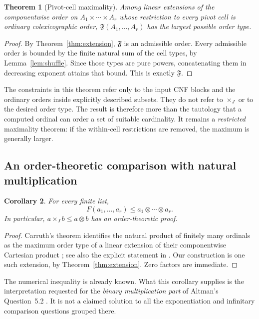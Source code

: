 \documentclass[11pt,letterpaper]{article}
\newtheorem{theorem}{Theorem}[section]
\newtheorem{corollary}[theorem]{Corollary}
\theoremstyle{definition}
\theoremstyle{remark}
\newcommand{\J}{\mathbin{\times_{\!J}}}
\newcommand{\FF}{\mathfrak F}
\begin{document}
\begin{theorem}[Pivot-cell maximality]\label{thm:maximality}
Among linear extensions of the componentwise order on
$A_1\times\cdots\times A_r$ whose restriction to every pivot cell is
ordinary colexicographic order, $\FF(A_1,\ldots,A_r)$ has the largest
possible order type.
\end{theorem}

\begin{proof}
By Theorem~\ref{thm:extension}, $\FF$ is an admissible order. Every
admissible order is bounded by the finite natural sum of the cell types,
by Lemma~\ref{lem:shuffle}. Since those types are pure powers, concatenating
them in decreasing exponent attains that bound. This is exactly $\FF$.
\end{proof}

The constraints in this theorem refer only to the input CNF blocks and
the ordinary orders inside explicitly described subsets. They do not
refer to $\J$ or to the desired order type. The result is therefore more
than the tautology that a computed ordinal can order a set of suitable
cardinality. It remains a \emph{restricted} maximality theorem: if the
within-cell restrictions are removed, the maximum is generally larger.

\subsection{An order-theoretic comparison with natural multiplication}

\begin{corollary}\label{cor:natural-upper}
For every finite list,
\[
 F(a_1,\ldots,a_r)\leq a_1\otimes\cdots\otimes a_r.
\]
In particular, $a\J b\leq a\otimes b$ has an order-theoretic proof.
\end{corollary}

\begin{proof}
Carruth's theorem identifies the natural product of finitely many
ordinals as the maximum order type of a linear extension of their
componentwise Cartesian product \cite{carruth}; see also the explicit
statement in \cite[Section~3.3]{lip-product}. Our construction is one such
extension, by Theorem~\ref{thm:extension}. Zero factors are immediate.
\end{proof}

The numerical inequality is already known. What this corollary supplies
is the interpretation requested for the \emph{binary multiplication
part} of Altman's Question~5.2 \cite{altman}. It is not a claimed solution
to all the exponentiation and infinitary comparison questions grouped
there.
\end{document}
